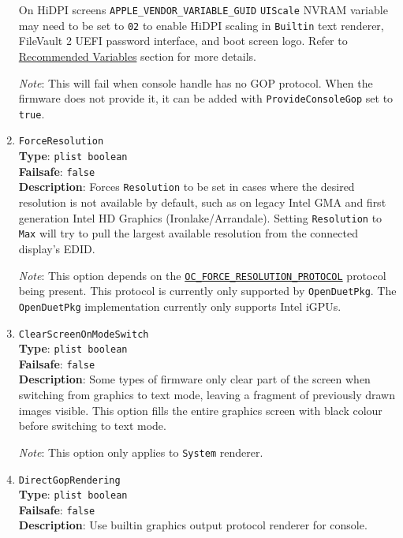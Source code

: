 \documentclass[]{article}
\begin{document}
\begin{enumerate}
  On HiDPI screens \texttt{APPLE\_VENDOR\_VARIABLE\_GUID} \texttt{UIScale}
  NVRAM variable may need to be set to \texttt{02} to enable HiDPI scaling
  in \texttt{Builtin} text renderer, FileVault 2 UEFI password interface,
  and boot screen logo. Refer to \hyperref[nvramvarsrec]{Recommended Variables}
  section for more details.

  \emph{Note}: This will fail when console handle has no GOP protocol. When
  the firmware does not provide it, it can be added with \texttt{ProvideConsoleGop}
  set to \texttt{true}.

\item
  \texttt{ForceResolution}\\
  \textbf{Type}: \texttt{plist\ boolean}\\
  \textbf{Failsafe}: \texttt{false}\\
  \textbf{Description}: Forces \texttt{Resolution} to be set in cases where the desired
  resolution is not available by default, such as on legacy Intel GMA and first
  generation Intel HD Graphics (Ironlake/Arrandale). Setting \texttt{Resolution} to
  \texttt{Max} will try to pull the largest available resolution from the connected
  display's EDID.

  \emph{Note}: This option depends on the \href{https://github.com/acidanthera/OpenCorePkg/blob/master/Include/Acidanthera/Protocol/OcForceResolution.h}{\texttt{OC\_FORCE\_RESOLUTION\_PROTOCOL}}
  protocol being present. This protocol is currently only supported by \texttt{OpenDuetPkg}. The
  \texttt{OpenDuetPkg} implementation currently only supports Intel iGPUs.

\item
  \texttt{ClearScreenOnModeSwitch}\\
  \textbf{Type}: \texttt{plist\ boolean}\\
  \textbf{Failsafe}: \texttt{false}\\
  \textbf{Description}: Some types of firmware only clear part of the screen when switching
  from graphics to text mode, leaving a fragment of previously drawn images visible.
  This option fills the entire graphics screen with black colour before switching to
  text mode.

  \emph{Note}: This option only applies to \texttt{System} renderer.

\item
  \texttt{DirectGopRendering}\\
  \textbf{Type}: \texttt{plist\ boolean}\\
  \textbf{Failsafe}: \texttt{false}\\
  \textbf{Description}: Use builtin graphics output protocol renderer for console.


\end{enumerate}
\end{document}
